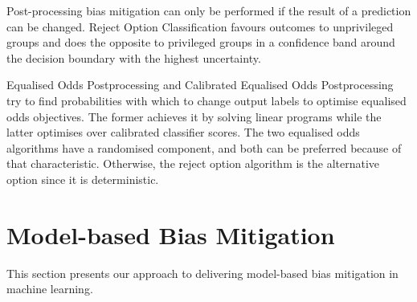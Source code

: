 \documentclass[sigconf]{acmart}
\begin{document}
	
	
	Post-processing bias mitigation can only be performed if the result of a prediction can be changed. Reject Option Classification \cite{kamiran2012reject} favours outcomes to unprivileged groups and does the opposite to privileged groups in a confidence band around the decision boundary with the highest uncertainty.
	{Equalised Odds Postprocessing \cite{hardt2016equal,pleiss2017equal} and Calibrated Equalised Odds Postprocessing \cite{pleiss2017equal} try to find probabilities with which to change output labels to optimise equalised odds objectives. The former achieves it by solving linear programs while the latter optimises over calibrated classifier scores. The two equalised odds algorithms have a randomised component, and both can be preferred because of that characteristic. Otherwise, the reject option algorithm is the alternative option since it is deterministic.
		
		\section{Model-based Bias Mitigation}
		\label{sec:model_based_bias_mitigation}
		
		This section presents our approach to delivering model-based bias mitigation in machine learning. 
		
}
\end{document}
